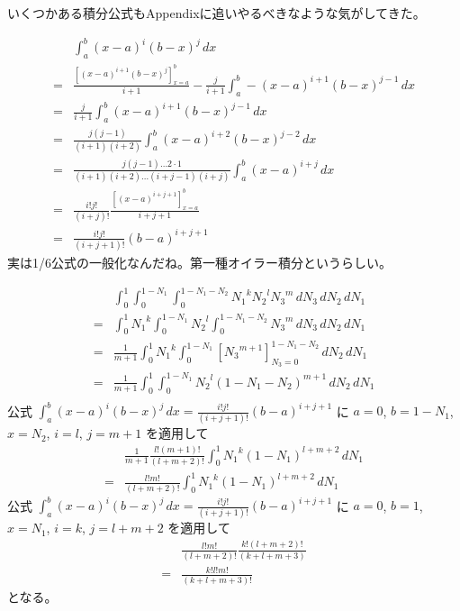 いくつかある積分公式もAppendixに追いやるべきなような気がしてきた。

\begin{align}
&\int_a^b\left(x-a\right)^i\left(b-x\right)^j\,dx\\
=&\frac{\left[\left(x-a\right)^{i+1}\left(b-x\right)^j\right]_{x=a}^{b}}{i+1}
 - \frac{j}{i+1}\int_a^b-\left(x-a\right)^{i+1}\left(b-x\right)^{j-1}\,dx\\
=&\frac{j}{i+1}\int_a^b\left(x-a\right)^{i+1}\left(b-x\right)^{j-1}\,dx\\
=&\frac{j\left(j-1\right)}{\left(i+1\right)\left(i+2\right)}
  \int_a^b\left(x-a\right)^{i+2}\left(b-x\right)^{j-2}\,dx\\
=&\frac{j\left(j-1\right)\ldots2\cdot1}
       {\left(i+1\right)\left(i+2\right)
        \ldots\left(i+j-1\right)\left(i+j\right)}
  \int_a^b\left(x-a\right)^{i+j}\,dx\\
=&\frac{i!j!}{\left(i+j\right)!}
  \frac{\left[\left(x-a\right)^{i+j+1}\right]_{x=a}^b}
       {i+j+1}\\
=&\frac{i!j!}{\left(i+j+1\right)!}\left(b-a\right)^{i+j+1}
\end{align}
実は1/6公式の一般化なんだね。第一種オイラー積分というらしい。

\begin{align}
&\int_0^1\int_0^{1-N_1}\int_0^{1-N_1-N_2}
{N_1}^k{N_2}^l{N_3}^m
\,dN_3\,dN_2\,dN_1\\
=&
\int_0^1{N_1}^k\int_0^{1-N_1}{N_2}^l\int_0^{1-N_1-N_2}{N_3}^m
\,dN_3\,dN_2\,dN_1\\
=&
\frac{1}{m+1}
\int_0^1{N_1}^k\int_0^{1-N_1}
\left[{N_3}^{m+1}\right]_{N_3=0}^{1-N_1-N_2}
\,dN_2\,dN_1\\
=&\frac{1}{m+1}
\int_0^1\int_0^{1-N_1}
{N_2}^l\left(1-N_1-N_2\right)^{m+1}
\,dN_2\,dN_1\\
\end{align}
公式
$\displaystyle\int_a^b\left(x-a\right)^i\left(b-x\right)^j\,dx
=\frac{i!j!}{\left(i+j+1\right)!}\left(b-a\right)^{i+j+1}$
に
$a=0$, $b=1-N_1$, $x=N_2$, $i=l$, $j=m+1$
を適用して
\begin{align}
&\frac{1}{m+1}\frac{l!\left(m+1\right)!}{\left(l+m+2\right)!}
\int_0^1{N_1}^k
\left(1-N_1\right)^{l+m+2}
\,dN_1\\
=&\frac{l!m!}{\left(l+m+2\right)!}
\int_0^1{N_1}^k
\left(1-N_1\right)^{l+m+2}
\,dN_1
\end{align}
公式
$\displaystyle\int_a^b\left(x-a\right)^i\left(b-x\right)^j\,dx
=\frac{i!j!}{\left(i+j+1\right)!}\left(b-a\right)^{i+j+1}$
に
$a=0$, $b=1$, $x=N_1$, $i=k$, $j=l+m+2$
を適用して
\begin{align}
&\frac{l!m!}{\left(l+m+2\right)!}
\frac{k!\left(l+m+2\right)!}
     {\left(k+l+m+3\right)}\\
=&\frac{k!l!m!}{\left(k+l+m+3\right)!}
\end{align}
となる。

